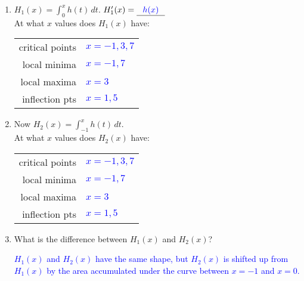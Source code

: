 \documentclass[letterpaper,11pt]{article}
\def\ds{\displaystyle}
\newcommand{\usol}[1]{\underline{\hspace{.1 in} \textcolor{blue}{#1} \hspace{.1 in}}}
\newcommand{\sol}[1]{\textcolor{blue}{#1}}
\newcommand{\usol}[1]{\underline{\hspace{.1 in} \textcolor{white}{#1} \hspace{.1 in}}}
\newcommand{\sol}[1]{\textcolor{white}{#1}}
\begin{document}
\begin{enumerate}
\vspace{-.1in}
\begin{enumerate}
\item $\ds H_1(x)=\int_0^x h(t) \,dt$. $H_1'(x)=\usol{h(x)}$ \\

At what $x$ values does $H_1(x)$ have:

{\tabulinesep=1.4mm
\begin{tabu}{ r  l }
 critical points & \usol{$x=-1, 3, 7$} \\
 local minima & \usol{$x=-1, 7$} \\
 local maxima & \usol{$x=3$} \\
 inflection pts & \usol{$x=1, 5$} \\
\end{tabu}}

\vspace{.3 in}

\item Now $\ds H_2(x)=\int_{-1}^x h(t) \,dt$. \\

At what $x$ values does $H_2(x)$ have:

{\tabulinesep=1.4mm
\begin{tabu}{ r  l }
 critical points & \usol{$x=-1, 3, 7$} \\
 local minima & \usol{$x=-1, 7$} \\
 local maxima & \usol{$x=3$} \\
 inflection pts & \usol{$x=1, 5$} \\
\end{tabu}}

\vspace{.3 in}

\item What is the difference between $H_1(x)$ and $H_2(x)$?

\sol{$H_1(x)$ and $H_2(x)$ have the same shape, but $H_2(x)$ is shifted up from $H_1(x)$ by the area accumulated under the curve between $x=-1$ and $x=0$.}

\end{enumerate}
\end{enumerate}
\end{document}
